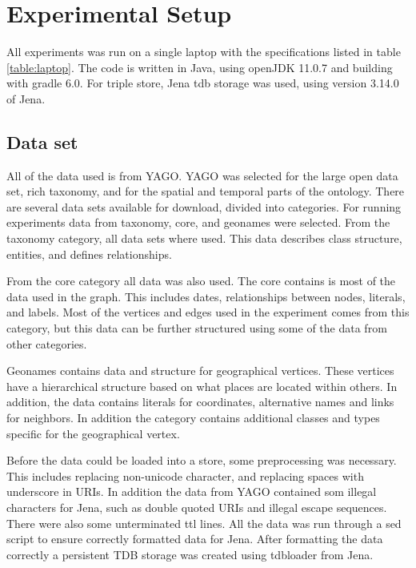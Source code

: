 \section{Experimental Setup}
\label{sec:experimentalSetup}
All experiments was run on a single laptop with the specifications listed in table \ref{table:laptop}. The code is written in Java, using openJDK 11.0.7 and building with gradle 6.0. For triple store, Jena tdb storage was used, using version 3.14.0 of Jena.


\subsection{Data set}
All of the data used is from YAGO. YAGO was selected for the large open data set, rich taxonomy, and for the spatial and temporal parts of the ontology. There are several data sets available for download, divided into categories. For running experiments data from taxonomy, core, and geonames were selected. From the taxonomy category, all data sets where used. This data describes class structure, entities, and defines relationships.

From the core category all data was also used. The core contains is most of the data used in the graph. This includes dates, relationships between nodes, literals, and labels. Most of the vertices and edges used in the experiment comes from this category, but this data can be further structured using some of the data from other categories.

Geonames contains data and structure for geographical vertices. These vertices have a hierarchical structure based on what places are located within others. In addition, the data contains literals for coordinates, alternative names and links for neighbors. In addition the category contains additional classes and types specific for the geographical vertex.

Before the data could be loaded into a store, some preprocessing was necessary. This includes replacing non-unicode character, and replacing spaces with underscore in URIs. In addition the data from YAGO contained som illegal characters for Jena, such as double quoted URIs and illegal escape sequences. There were also some unterminated ttl lines. All the data was run through a sed script to ensure correctly formatted data for Jena. After formatting the data correctly a persistent TDB storage was created using tdbloader from Jena.



